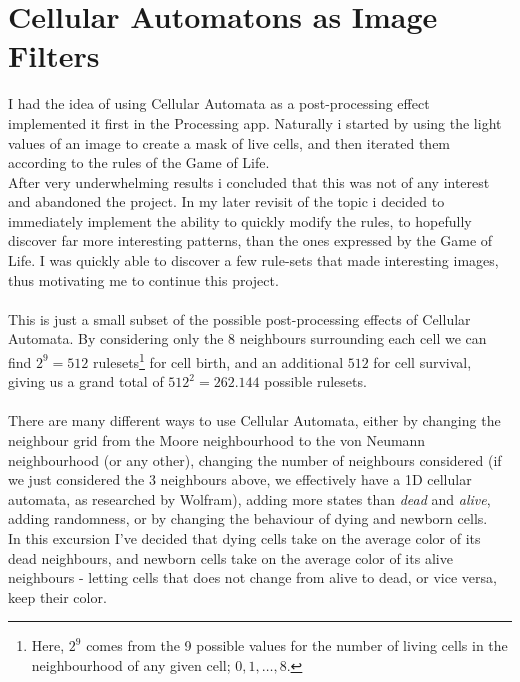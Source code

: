 \section{Cellular Automatons as Image Filters}
I had the idea of using Cellular Automata as a post-processing effect implemented it first in the Processing app. Naturally i started
by using the light values of an image to create a mask of live cells, and then iterated them according to the rules of the Game of Life.
\\
After very underwhelming results i concluded that this was not of any interest and abandoned the project. In my later revisit of the topic
i decided to immediately implement the ability to quickly modify the rules, to hopefully discover far more interesting patterns, than the ones
expressed by the Game of Life. I was quickly able to discover a few rule-sets that made interesting images, thus motivating me
to continue this project.
\\\\
This is just a small subset of the possible post-processing effects of Cellular Automata. By considering only the 8 neighbours
surrounding each cell we can find $2^9=512$ rulesets\footnote{Here, $2^9$ comes from the 9 possible values for the number of living cells in the
neighbourhood of any given cell; $0,1,\ldots,8$.} for cell birth, and an additional $512$ for cell survival, giving us a grand total of
$512^2=262.144$ possible rulesets. \\\\
There are many different ways to use Cellular Automata, either by changing the neighbour grid from the Moore 
neighbourhood to the von Neumann neighbourhood (or any other), changing the number of neighbours considered (if we just considered the 3 neighbours above, we 
effectively have a 1D cellular automata, as researched by Wolfram), adding more states than \textit{dead} and \textit{alive}, adding randomness,
or by changing the behaviour of dying and newborn cells. \\
In this excursion I've decided that dying cells take on the average color of its dead neighbours, and newborn cells take on the average 
color of its alive neighbours - letting cells that does not change from alive to dead, or vice versa, keep their color.